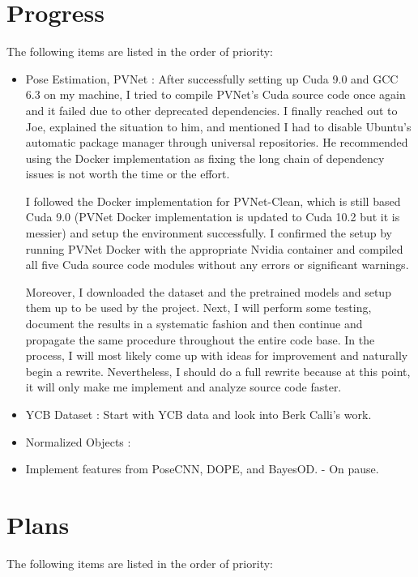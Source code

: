 \documentclass[11pt]{article}
\begin{document}
\section{Progress}
The following items are listed in the order of priority:
\begin{itemize}
      \item Pose Estimation, PVNet \cite{peng2019pvnet}: After successfully
      setting up Cuda 9.0 and GCC 6.3 on my machine, I tried to compile PVNet's
      Cuda source code once again and it failed due to other deprecated
      dependencies. I
      finally reached out to Joe, explained the situation to him, and
      mentioned I had to disable Ubuntu's automatic package manager through
      universal repositories. He recommended using the Docker implementation as
      fixing the long chain of dependency issues is not worth the time or the
      effort.

      I followed the Docker implementation for PVNet-Clean, which is still based
      Cuda 9.0 (PVNet Docker implementation is updated to Cuda 10.2 but it is
      messier) and setup
      the environment successfully. I confirmed the setup by running PVNet
      Docker with the appropriate Nvidia container and compiled all five Cuda
      source code modules without any errors or significant warnings.

      Moreover, I downloaded the dataset and the pretrained models and setup them
      up to be used by the project. Next, I will perform some testing, document
      the results in a systematic fashion and then continue and propagate the
      same
      procedure throughout the entire code base. In the process, I will most
      likely come up with ideas for improvement and naturally begin a rewrite.
      Nevertheless, I should do a full rewrite because at this point, it will
      only make me implement and analyze source code faster.

      \item YCB Dataset \cite{calli2015ycb}: Start with YCB data and look into
      Berk Calli's work.
      \item Normalized Objects \cite{Wang_2019_CVPR}:
      \item Implement features from PoseCNN, DOPE, and BayesOD. - On pause.
\end{itemize}


\section{Plans}
The following items are listed in the order of priority:
\end{document}
